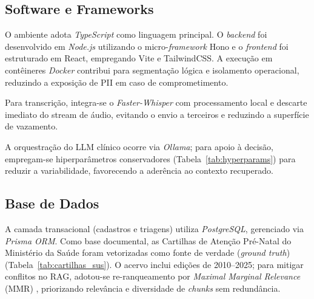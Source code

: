 \documentclass[12pt]{article}
\begin{document}

\subsection{Software e Frameworks}

O ambiente adota \textit{TypeScript} como linguagem principal.
O \textit{backend} foi desenvolvido em \textit{Node.js} utilizando o micro-\textit{framework} Hono e o \textit{frontend} foi estruturado em React, empregando Vite e TailwindCSS.
A execução em contêineres \textit{Docker} contribui para segmentação lógica e isolamento operacional, reduzindo a exposição de PII em caso de comprometimento.

Para transcrição, integra-se o \textit{Faster-Whisper} com processamento local e descarte imediato do stream de áudio, evitando o envio a terceiros e reduzindo a superfície de vazamento.

A orquestração do LLM clínico ocorre via \textit{Ollama}; para apoio à decisão, empregam-se hiperparâmetros conservadores (Tabela~\ref{tab:hyperparams}) para reduzir a variabilidade, favorecendo a aderência ao contexto recuperado.

\subsection{Base de Dados}

A camada transacional (cadastros e triagens) utiliza \textit{PostgreSQL}, gerenciado via \textit{Prisma ORM}.
Como base documental, as Cartilhas de Atenção Pré-Natal do Ministério da Saúde foram vetorizadas como fonte de verdade (\textit{ground truth}) (Tabela~\ref{tab:cartilhas_sus}).
O acervo inclui edições de 2010--2025; para mitigar conflitos no RAG, adotou-se re-ranqueamento por \textit{Maximal Marginal Relevance} (MMR) \cite{CarbonellGoldstein1998MMR}, priorizando relevância e diversidade de \textit{chunks} sem redundância.
\end{document}
